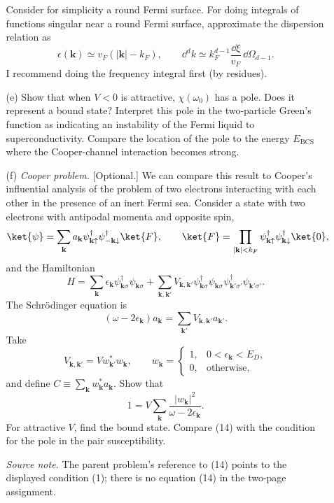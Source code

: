 \begin{enumerate}
\begin{enumerate}
    Consider for simplicity a round Fermi surface.  For doing integrals
    of functions singular near a round Fermi surface, approximate the
    dispersion relation as
    \[
      \epsilon(\mathbf k)\simeq v_F(|\mathbf k|-k_F),
      \qquad
      \dd^dk\simeq k_F^{d-1}\frac{\dd\xi}{v_F}\,\dd\Omega_{d-1}.
    \]
    I recommend doing the frequency integral first (by residues).
    \item[(e)]
    Show that when \(V<0\) is attractive, \(\chi(\omega_0)\) has a pole.
    Does it represent a bound state?  Interpret this pole in the
    two-particle Green's function as indicating an instability of the
    Fermi liquid to superconductivity.  Compare the location of the pole
    to the energy \(E_{\mathrm{BCS}}\) where the Cooper-channel
    interaction becomes strong.
    \item[(f)]
    \emph{Cooper problem.}  [Optional.]  We can compare this result to
    Cooper's influential analysis of the problem of two electrons
    interacting with each other in the presence of an inert Fermi sea.
    Consider a state with two electrons with antipodal momenta and
    opposite spin,
    \[
      \ket{\psi}=\sum_{\mathbf k}a_{\mathbf k}
        \psi^\dagger_{\mathbf k\uparrow}
        \psi^\dagger_{-\mathbf k\downarrow}\ket{F},
      \qquad
      \ket{F}=\prod_{|\mathbf k|<k_F}
        \psi^\dagger_{\mathbf k\uparrow}
        \psi^\dagger_{\mathbf k\downarrow}\ket{0} ,
    \]
    and the Hamiltonian
    \[
      H=\sum_{\mathbf k}\epsilon_{\mathbf k}
        \psi^\dagger_{\mathbf k\sigma}\psi_{\mathbf k\sigma}
       +\sum_{\mathbf k,\mathbf k'}V_{\mathbf k,\mathbf k'}
        \psi^\dagger_{\mathbf k\sigma}\psi_{\mathbf k\sigma}
        \psi^\dagger_{\mathbf k'\sigma'}\psi_{\mathbf k'\sigma'} .
    \]
    The Schrödinger equation is
    \[
      (\omega-2\epsilon_{\mathbf k})a_{\mathbf k}
        =\sum_{\mathbf k'}V_{\mathbf k,\mathbf k'}a_{\mathbf k'} .
    \]
    Take
    \[
      V_{\mathbf k,\mathbf k'}=Vw_{\mathbf k'}^*w_{\mathbf k},
      \qquad
      w_{\mathbf k}=
      \begin{cases}
        1,&0<\epsilon_{\mathbf k}<E_D,\\
        0,&\text{otherwise},
      \end{cases}
    \]
    and define \(C\equiv\sum_{\mathbf k}w_{\mathbf k}^*a_{\mathbf k}\).
    Show that
    \begin{equation}
      1=V\sum_{\mathbf k}
        \frac{|w_{\mathbf k}|^2}{\omega-2\epsilon_{\mathbf k}} .
      \tag{1}
    \end{equation}
    For attractive \(V\), find the bound state.  Compare (14) with the
    condition for the pole in the pair susceptibility.

    \emph{Source note.}  The parent problem's reference to (14) points to
    the displayed condition (1); there is no equation (14) in the
    two-page assignment.
  \end{enumerate}

\end{enumerate}
